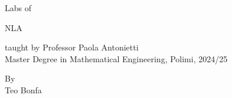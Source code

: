 \documentclass[a4paper,10pt]{book}
\begin{document}
\frontmatter

\thispagestyle{empty}
\vspace*{\fill}

\begin{center}


    \vspace*{3cm}

    {\large Labs of}\\
    
    \vspace*{1.5cm}
    
    {\Huge \textsc{NLA}}\\
    
    \vspace*{1.5cm}
    
    {\large taught by Professor Paola Antonietti}\\
    \vspace*{0.3cm}
    {\large Master Degree in Mathematical Engineering, Polimi, 2024/25}\\

    \vspace*{6cm}

    {\large By}\\
    \vspace*{0.3cm}
    {\large Teo Bonfa}\\

    \vspace*{1.5cm}

\end{center}
\vspace*{\fill}
\clearpage


\cleardoublepage
\tableofcontents
\cleardoublepage

\mainmatter
\pagestyle{empty}











\end{document}
